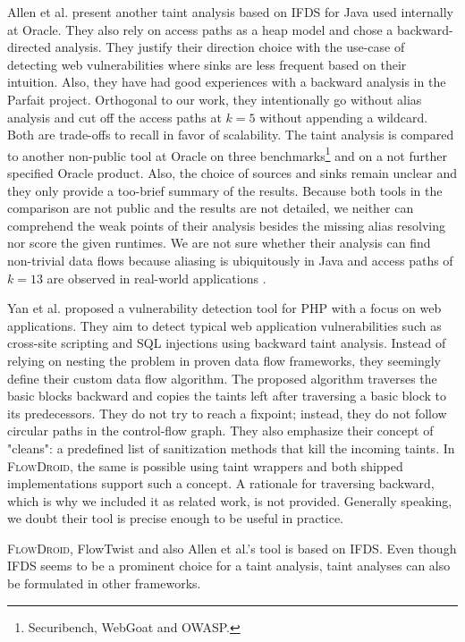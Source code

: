\documentclass[../draft.tex]{subfiles}
\begin{document}
    Allen et al.\cite{Allen2021} present another taint analysis based on IFDS for Java used internally at Oracle.
    They also rely on access paths as a heap model and chose a backward-directed analysis.
    They justify their direction choice with the use-case of detecting web vulnerabilities where sinks are less frequent based on their intuition.
    Also, they have had good experiences with a backward analysis in the Parfait\cite{Winter2013} project.
    Orthogonal to our work, they intentionally go without alias analysis and cut off the access paths at $k=5$ without appending a wildcard.
    Both are trade-offs to recall in favor of scalability.
    The taint analysis is compared to another non-public tool at Oracle on three benchmarks\footnote{Securibench, WebGoat and OWASP.} and on a not further specified Oracle product.
    Also, the choice of sources and sinks remain unclear and they only provide a too-brief summary of the results.
    Because both tools in the comparison are not public and the results are not detailed, we neither can comprehend the weak points of their analysis besides the missing alias resolving nor score the given runtimes.
    We are not sure whether their analysis can find non-trivial data flows because aliasing is ubiquitously in Java and access paths of $k=13$ are observed in real-world applications \cite{Spaeth2019}.

    Yan et al.\cite{Yan2017} proposed a vulnerability detection tool for PHP with a focus on web applications.
    They aim to detect typical web application vulnerabilities such as cross-site scripting and SQL injections using backward taint analysis.
    Instead of relying on nesting the problem in proven data flow frameworks, they seemingly define their custom data flow algorithm.
    The proposed algorithm traverses the basic blocks backward and copies the taints left after traversing a basic block to its predecessors.
    They do not try to reach a fixpoint; instead, they do not follow circular paths in the control-flow graph.
    They also emphasize their concept of "cleans": a predefined list of sanitization methods that kill the incoming taints.
    In \textsc{FlowDroid}, the same is possible using taint wrappers and both shipped implementations support such a concept.
    A rationale for traversing backward, which is why we included it as related work, is not provided.
    Generally speaking, we doubt their tool is precise enough to be useful in practice.

    \textsc{FlowDroid}, FlowTwist and also Allen et al.'s tool is based on IFDS.
    Even though IFDS seems to be a prominent choice for a taint analysis, taint analyses can also be formulated in other frameworks.
\end{document}
